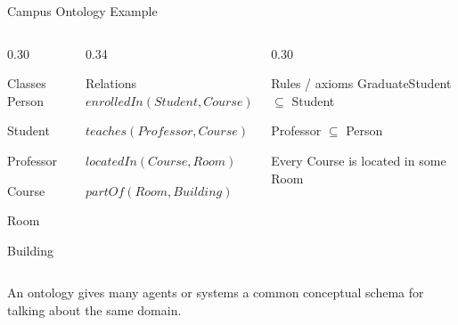 \documentclass[aspectratio=169,10pt]{beamer}
\begin{document}
\begin{frame}[shrink=10]{Campus Ontology Example}
  \begin{columns}[T,onlytextwidth]
    \begin{column}{0.30\textwidth}
      \begin{block}{Classes}
        Person

        Student

        Professor

        Course

        Room

        Building
      \end{block}
    \end{column}
    \begin{column}{0.34\textwidth}
      \begin{block}{Relations}
        $enrolledIn(Student,Course)$

        $teaches(Professor,Course)$

        $locatedIn(Course,Room)$

        $partOf(Room,Building)$
      \end{block}
    \end{column}
    \begin{column}{0.30\textwidth}
      \begin{block}{Rules / axioms}
        GraduateStudent $\subseteq$ Student

        Professor $\subseteq$ Person

        Every Course is located in some Room
      \end{block}
    \end{column}
  \end{columns}

  \begin{keyidea}
    An ontology gives many agents or systems a common conceptual schema for talking about the same domain.
  \end{keyidea}
\end{frame}
\end{document}

